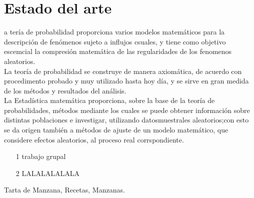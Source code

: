 \documentclass[a4,papper]{IEEEtran}
\begin{document}
\section{Estado del arte}
a tería de probabilidad proporciona varios modelos matemáticos para la descripción de fenómenos sujeto a influjos csuales, y tiene como objetivo escemcial la compresión matemática de las regularidades de los fenomenos aleatorios.\\
La teoría de probabilidad se construye de manera axiomática, de acuerdo con procedimento probado y muy utilizado hasta hoy día, y se sirve en gran medida de los métodos y resultados del análisis.\\
La Estadística matemática proporciona, sobre la base de la teoría de probabilidades, métodos mediante los cuales se puede obtener información sobre distintas poblaciones e investigar, utilizando datosmuestrales aleatorios;con esto se da origen también a métodos de ajuste de un modelo matemático, que considere efectos aleatorios, al proceso real corrspondiente.\\
\begin{itemize}[]
\item[1] trabajo grupal
\item[2] LALALALALALA
\end{itemize}

\begin{IEEEkeywords}
Tarta de Manzana, Recetas, Manzanas.
\end{IEEEkeywords}
 
\end{document}
